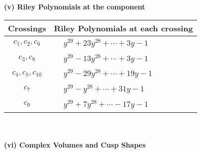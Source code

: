 \documentclass[1p]{elsarticle_modified}
\theoremstyle{definition}
\begin{document}
\newpage\renewcommand{\arraystretch}{1}
\flushleft \textbf{(v) Riley Polynomials at the component}\newline \\
\begin{tabular}{m{50pt}|m{274pt}}
Crossings & \hspace{64pt}Riley Polynomials at each crossing \\
\hline $$\begin{aligned}c_{1},c_{2},c_{6}\end{aligned}$$&$\begin{aligned}
&y^{29}+23 y^{28}+\cdots+3 y-1
\end{aligned}$\\
\hline $$\begin{aligned}c_{3},c_{8}\end{aligned}$$&$\begin{aligned}
&y^{29}-13 y^{28}+\cdots+3 y-1
\end{aligned}$\\
\hline $$\begin{aligned}c_{4},c_{5},c_{10}\end{aligned}$$&$\begin{aligned}
&y^{29}-29 y^{28}+\cdots+19 y-1
\end{aligned}$\\
\hline $$\begin{aligned}c_{7}\end{aligned}$$&$\begin{aligned}
&y^{29}- y^{28}+\cdots+31 y-1
\end{aligned}$\\
\hline $$\begin{aligned}c_{9}\end{aligned}$$&$\begin{aligned}
&y^{29}+7 y^{28}+\cdots-17 y-1
\end{aligned}$\\
\hline
\end{tabular}\\~\\
\newpage\flushleft \textbf{(vi) Complex Volumes and Cusp Shapes}
\end{document}
